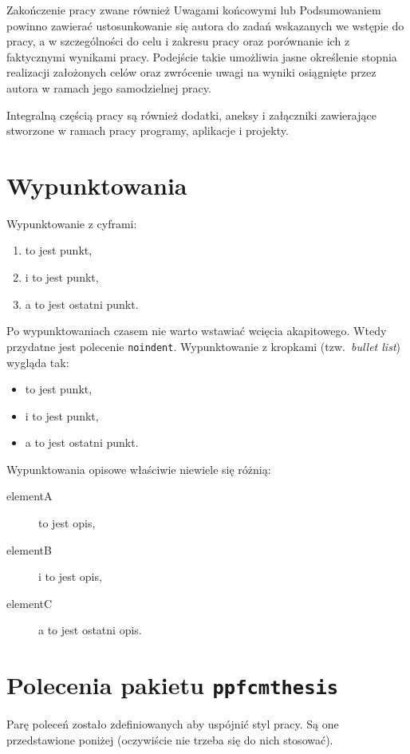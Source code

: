 Zakończenie pracy zwane również Uwagami końcowymi lub Podsumowaniem powinno zawierać ustosunkowanie
się autora do zadań wskazanych we wstępie do pracy, a w szczególności do celu i zakresu pracy oraz
porównanie ich z faktycznymi wynikami pracy. Podejście takie umożliwia jasne określenie stopnia
realizacji założonych celów oraz zwrócenie uwagi na wyniki osiągnięte przez autora w ramach jego
samodzielnej pracy.

Integralną częścią pracy są również dodatki, aneksy i załączniki zawierające stworzone w ramach pracy programy, aplikacje i projekty.



\section{Wypunktowania}

Wypunktowanie z cyframi:
\begin{enumerate}
    \item to jest punkt,
    \item i to jest punkt,
    \item a to jest ostatni punkt.
\end{enumerate}

\noindent
Po wypunktowaniach czasem nie warto wstawiać wcięcia akapitowego. Wtedy przydatne jest
polecenie \texttt{noindent}. Wypunktowanie z kropkami (tzw.~\emph{bullet list}) wygląda tak:
\begin{itemize}
    \item to jest punkt,
    \item i to jest punkt,
    \item a to jest ostatni punkt.
\end{itemize}

\noindent
Wypunktowania opisowe właściwie niewiele się różnią:
\begin{description}
    \item[elementA] to jest opis,
    \item[elementB] i to jest opis,
    \item[elementC] a to jest ostatni opis.
\end{description}


\section{Polecenia pakietu \texttt{ppfcmthesis}}

Parę poleceń zostało zdefiniowanych aby uspójnić styl pracy. Są one przedstawione poniżej
(oczywiście nie trzeba się do nich stosować).

